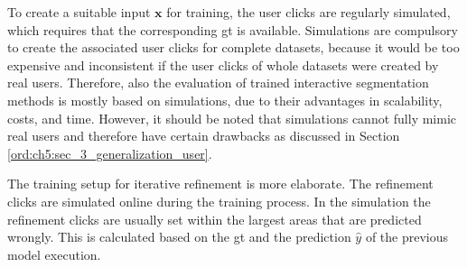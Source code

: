 To create a suitable input $\textbf{x}$ for training, the user clicks are regularly simulated, which requires that the corresponding \gls{gt} is available.
Simulations are compulsory to create the associated user clicks for complete datasets, because it would be too expensive and inconsistent if the user clicks of whole datasets were created by real users.
Therefore, also the evaluation of trained interactive segmentation methods is mostly based on simulations, due to their advantages in scalability, costs, and time.
However, it should be noted that simulations cannot fully mimic real users and therefore have certain drawbacks as discussed in Section \ref{ord:ch5:sec_3_generalization_user}.

The training setup for iterative refinement is more elaborate.
The refinement clicks are simulated online during the training process.
In the simulation the refinement clicks are usually set within the largest areas that are predicted wrongly.
This is calculated based on the \gls{gt} and the prediction $\hat{y}$ of the previous model execution.

